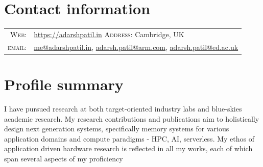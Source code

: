 \documentclass[a4paper,10pt]{article} %
\begin{document}
\pagestyle{empty} %



\par{\bigskip\par} %

\section{Contact information}

\begin{tabular}{rl}
\textsc{Web:} & \href{https://adarshpatil.in/timewarp}{https://adarshpatil.in} \hspace{2cm} \textsc{Address:} Cambridge, UK\\
\textsc{email:} & \href{mailto:me@adarshpatil.in}{me@adarshpatil.in},
\href{mailto:adarsh.patil@arm.com}{adarsh.patil@arm.com}, \href{mailto:adarsh.patil@ed.ac.uk}{adarsh.patil@ed.ac.uk}\\
\end{tabular}

\section{Profile summary}

I have pursued research at both target-oriented industry labs and blue-skies academic research.
My research contributions and publications aim to holistically design next generation systems, specifically memory systems for various application domains and compute paradigms - HPC, AI, serverless.
My ethos of application driven hardware research is reflected in all my works, each of which span several aspects of my proficiency
\end{document}

